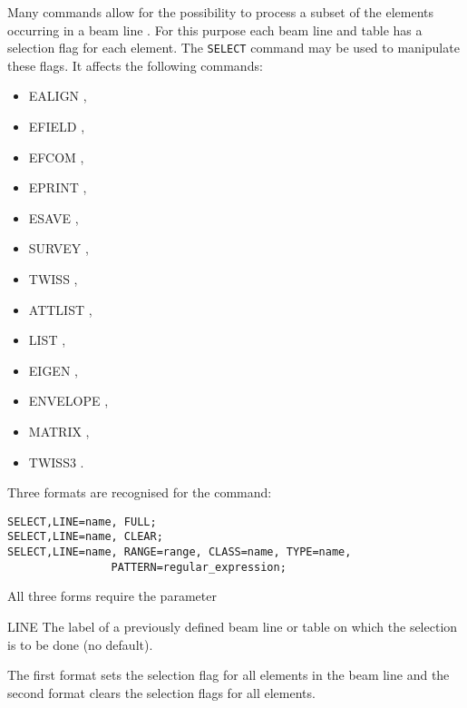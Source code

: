 Many \opal commands allow for the possibility to process
a subset of the elements occurring in a beam line .
For this purpose each beam line  and
table  has a selection flag for each element.
The \texttt{SELECT} command may be used to manipulate these flags.
It affects the following commands:
\begin{itemize}
\item {EALIGN} ,
\item {EFIELD} ,
\item {EFCOM} ,
\item {EPRINT} ,
\item {ESAVE} ,
\item {SURVEY} ,
\item {TWISS} ,
\item {ATTLIST} ,
\item {LIST} ,
\item {EIGEN} ,
\item {ENVELOPE} ,
\item {MATRIX} ,
\item {TWISS3} .
\end{itemize}
Three formats are recognised for the command:
\begin{verbatim}
SELECT,LINE=name, FULL;
SELECT,LINE=name, CLEAR;
SELECT,LINE=name, RANGE=range, CLASS=name, TYPE=name,
                PATTERN=regular_expression;
\end{verbatim}
All three forms require the parameter
\begin{kdescription}
\item[LINE]
  The label of a previously defined beam line  or
  table  on which the selection is to be done (no default).
\end{kdescription}
The first format sets the selection flag for all elements in the beam line
and the second format clears the selection flags for all elements.

